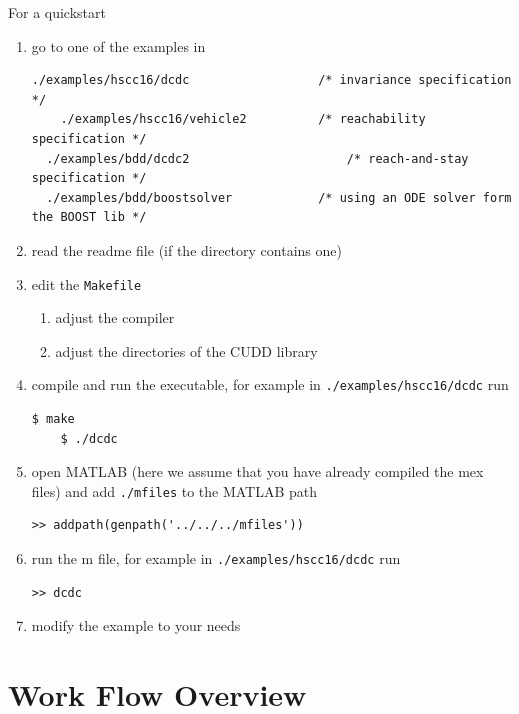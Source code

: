 \documentclass[a4paper]{amsart}
\begin{document}
For a quickstart 
\begin{enumerate}
	\item go to one of the examples in
	\begin{lstlisting}[basicstyle=\footnotesize\ttfamily]
	./examples/hscc16/dcdc      			/* invariance specification */ 
	./examples/hscc16/vehicle2      	/* reachability specification */ 
  ./examples/bdd/dcdc2      				/* reach-and-stay specification */ 
  ./examples/bdd/boostsolver 		   	/* using an ODE solver form the BOOST lib */ 
	\end{lstlisting}
	\item read the readme file (if the directory contains one)
	\item edit the {\tt \small Makefile} 
	\begin{enumerate}
		\item adjust the compiler
		\item adjust the directories of the CUDD library 
 \end{enumerate}
	\item compile and run the executable, for example in  {\tt \small ./examples/hscc16/dcdc} run
\begin{lstlisting}[basicstyle=\small\ttfamily,frame=none]
	$ make
	$ ./dcdc 
\end{lstlisting}
  \item open MATLAB (here we assume that you have already compiled the mex files)
    and add {\tt \small ./mfiles} to the MATLAB path 
\begin{lstlisting}[basicstyle=\small\ttfamily,frame=none]
  >> addpath(genpath('../../../mfiles')) 
\end{lstlisting}
  \item run the m file, for example in  {\tt \small ./examples/hscc16/dcdc} run
\begin{lstlisting}[basicstyle=\small\ttfamily,frame=none]
	>> dcdc
\end{lstlisting}
\item modify the example to your needs
\end{enumerate}




\section{Work Flow Overview}
\end{document}
